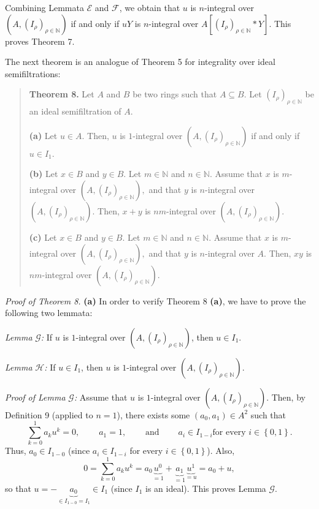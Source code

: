 \documentclass[12pt,final,notitlepage,onecolumn]{article}%
\begin{document}
Combining Lemmata $\mathcal{E}$ and $\mathcal{F}$, we obtain that $u$ is
$n$-integral over $\left(  A,\left(  I_{\rho}\right)  _{\rho\in\mathbb{N}%
}\right)  $ if and only if $uY$ is $n$-integral over $A\left[  \left(
I_{\rho}\right)  _{\rho\in\mathbb{N}}\ast Y\right]  $. This proves Theorem 7.

The next theorem is an analogue of Theorem 5 for integrality over ideal semifiltrations:

\begin{quote}
\textbf{Theorem 8.} Let $A$ and $B$ be two rings such that $A\subseteq B$. Let
$\left(  I_{\rho}\right)  _{\rho\in\mathbb{N}}$ be an ideal semifiltration of
$A$.

\textbf{(a)} Let $u\in A$. Then, $u$ is $1$-integral over $\left(  A,\left(
I_{\rho}\right)  _{\rho\in\mathbb{N}}\right)  $ if and only if $u\in I_{1}$.

\textbf{(b)} Let $x\in B$ and $y\in B$. Let $m\in\mathbb{N}$ and
$n\in\mathbb{N}$. Assume that $x$ is $m$-integral over $\left(  A,\left(
I_{\rho}\right)  _{\rho\in\mathbb{N}}\right)  ,$ and that $y$ is $n$-integral
over $\left(  A,\left(  I_{\rho}\right)  _{\rho\in\mathbb{N}}\right)  $. Then,
$x+y$ is $nm$-integral over $\left(  A,\left(  I_{\rho}\right)  _{\rho
\in\mathbb{N}}\right)  $.

\textbf{(c)} Let $x\in B$ and $y\in B$. Let $m\in\mathbb{N}$ and
$n\in\mathbb{N}$. Assume that $x$ is $m$-integral over $\left(  A,\left(
I_{\rho}\right)  _{\rho\in\mathbb{N}}\right)  ,$ and that $y$ is $n$-integral
over $A$. Then, $xy$ is $nm$-integral over $\left(  A,\left(  I_{\rho}\right)
_{\rho\in\mathbb{N}}\right)  $.
\end{quote}

\textit{Proof of Theorem 8.} \textbf{(a)} In order to verify Theorem 8
\textbf{(a)}, we have to prove the following two lemmata:

\textit{Lemma }$\mathcal{G}$\textit{:} If $u$ is $1$-integral over $\left(
A,\left(  I_{\rho}\right)  _{\rho\in\mathbb{N}}\right)  $, then $u\in I_{1}$.

\textit{Lemma} $\mathcal{H}$\textit{:} If $u\in I_{1}$, then $u$ is
$1$-integral over $\left(  A,\left(  I_{\rho}\right)  _{\rho\in\mathbb{N}%
}\right)  $.

\textit{Proof of Lemma }$\mathcal{G}$\textit{:} Assume that $u$ is
$1$-integral over $\left(  A,\left(  I_{\rho}\right)  _{\rho\in\mathbb{N}%
}\right)  $. Then, by Definition 9 (applied to $n=1$), there exists some
$\left(  a_{0},a_{1}\right)  \in A^{2}$ such that%
\[
\sum\limits_{k=0}^{1}a_{k}u^{k}=0,\ \ \ \ \ \ \ \ \ \ a_{1}%
=1,\ \ \ \ \ \ \ \ \ \ \text{and}\ \ \ \ \ \ \ \ \ \ a_{i}\in I_{1-i}\text{
for every }i\in\left\{  0,1\right\}  .
\]
Thus, $a_{0}\in I_{1-0}$ (since $a_{i}\in I_{1-i}$ for every $i\in\left\{
0,1\right\}  $). Also,%
\[
0=\sum\limits_{k=0}^{1}a_{k}u^{k}=a_{0}\underbrace{u^{0}}_{=1}+\underbrace
{a_{1}}_{=1}\underbrace{u^{1}}_{=u}=a_{0}+u,
\]
so that $u=-\underbrace{a_{0}}_{\in I_{1-0}=I_{1}}\in I_{1}$ (since $I_{1}$ is
an ideal). This proves Lemma $\mathcal{G}$.
\end{document}
